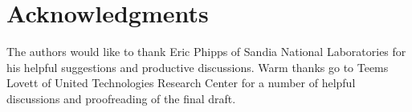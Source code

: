 \documentclass[10pt]{ijnam}
\theoremstyle{definition}
\begin{document}
\section*{Acknowledgments}
The authors would like to thank Eric Phipps of Sandia National Laboratories 
for his helpful suggestions and productive discussions. Warm thanks go to 
Teems Lovett of United Technologies Research Center
for a number of helpful discussions and proofreading of the final draft. 



\end{document}
